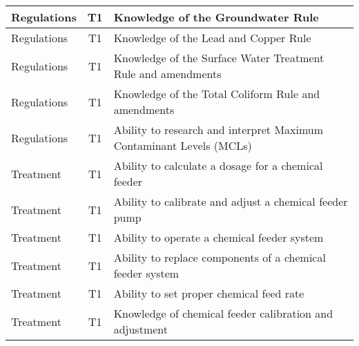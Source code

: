 \documentclass{article}
\begin{document}
\begin{table}[]
\begin{tabular}{|l|c|l|}
Regulations                            & T1             & Knowledge of the   Groundwater Rule                                                                                               \\ \hline
Regulations                            & T1             & Knowledge of the Lead   and Copper Rule                                                                                           \\ \hline
Regulations                            & T1             & Knowledge of the   Surface Water Treatment Rule and amendments                                                                    \\ \hline
Regulations                            & T1             & Knowledge of the   Total Coliform Rule and amendments                                                                             \\ \hline
Regulations                            & T1             & Ability to research   and interpret Maximum Contaminant Levels (MCLs)                                                             \\ \hline
Treatment                              & T1             & Ability to calculate   a dosage for a chemical feeder                                                                             \\ \hline
Treatment                              & T1             & Ability to calibrate   and adjust a chemical feeder pump                                                                          \\ \hline
Treatment                              & T1             & Ability to operate a   chemical feeder system                                                                                     \\ \hline
Treatment                              & T1             & Ability to replace   components of a chemical feeder system                                                                       \\ \hline
Treatment                              & T1             & Ability to set proper   chemical feed rate                                                                                        \\ \hline
Treatment                              & T1             & Knowledge of chemical   feeder calibration and adjustment                                                                         \\ \hline

\end{tabular}
\end{table}
\end{document}
